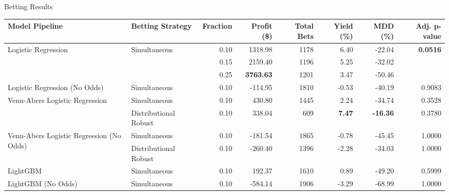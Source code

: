 \documentclass[final]{beamer}
\newlength{\colwidth}
\begin{document}
\begin{frame}[t]
\begin{columns}[t]
\begin{column}{\colwidth}
\begin{block}{Betting Results}
    \scriptsize
    \begin{table}[]
    \begin{tabular}{@{}llrrrrrr@{}}
    \toprule
    Model Pipeline                                            & Betting Strategy                    & Fraction & Profit (\$) & Total Bets & Yield (\%) & MDD (\%) & Adj. p-value        \\ \midrule
    \multirow{3}{*}{Logistic Regression}                      & \multirow{3}{*}{Simultaneous} & 0.10     & 1318.98     & 1178       & 6.40       & -22.04            & \multirow{3}{*}{\textbf{0.0516}} \\
                                                              &                                     & 0.15     & 2159.40     & 1196       & 5.25       & -32.02            &                           \\
                                                              &                                     & 0.25     & \textbf{3763.63}     & 1201       & 3.47       & -50.46            &                           \\
    Logistic Regression (No Odds)                             & Simultaneous                  & 0.10     & -114.95       & 1810       & -0.53       & -40.19            & 0.9083                  \\
    \multirow{2}{*}{Venn-Abers Logistic Regression}           & Simultaneous                  & 0.10     & 430.80      & 1445       & 2.24       & -34.74            & 0.3528                  \\
                                                              & Distributional Robust        & 0.10     & 338.04      & 609        & \textbf{7.47}       & \textbf{-16.36}            & 0.3780                  \\
    \multirow{2}{*}{Venn-Abers Logistic Regression (No Odds)} & Simultaneous                 & 0.10     & -181.54      & 1865       & -0.78      & -45.45            & 1.0000                  \\
                                                              & Distributional Robust         & 0.10     & -260.40     & 1396       & -2.28      & -34.03            & 1.0000                  \\
    LightGBM                                                  & Simultaneous                 & 0.10     & 192.37      & 1610       & 0.89       & -49.20            & 0.5999                  \\
    LightGBM (No Odds)                                        & Simultaneous                 & 0.10     & -584.14     & 1906       & -3.29      & -68.99            & 1.0000                  \\

\end{tabular}
\end{table}
\end{block}
\end{column}
\end{columns}
\end{frame}
\end{document}
